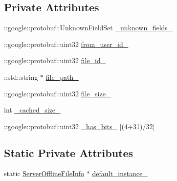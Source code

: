 \subsection*{Private Attributes}
\begin{DoxyCompactItemize}
\item 
\+::google\+::protobuf\+::\+Unknown\+Field\+Set \hyperlink{class_i_m_1_1_base_define_1_1_server_offline_file_info_a3db371e69c6def9894e21b296302ea57}{\+\_\+unknown\+\_\+fields\+\_\+}
\item 
\+::google\+::protobuf\+::uint32 \hyperlink{class_i_m_1_1_base_define_1_1_server_offline_file_info_ac1843ffaebde6c9c5b87404a31636320}{from\+\_\+user\+\_\+id\+\_\+}
\item 
\+::google\+::protobuf\+::uint32 \hyperlink{class_i_m_1_1_base_define_1_1_server_offline_file_info_a6137b1abb1911c49ff18cbd3031d4242}{file\+\_\+id\+\_\+}
\item 
\+::std\+::string $\ast$ \hyperlink{class_i_m_1_1_base_define_1_1_server_offline_file_info_a78eb84e4c11bdc5b62bdcde159904f4d}{file\+\_\+path\+\_\+}
\item 
\+::google\+::protobuf\+::uint32 \hyperlink{class_i_m_1_1_base_define_1_1_server_offline_file_info_a8d5232f21d1eaf7d01e7539654be4c47}{file\+\_\+size\+\_\+}
\item 
int \hyperlink{class_i_m_1_1_base_define_1_1_server_offline_file_info_a7a01cffe93d5f2d4f9a39f7e14e12d40}{\+\_\+cached\+\_\+size\+\_\+}
\item 
\+::google\+::protobuf\+::uint32 \hyperlink{class_i_m_1_1_base_define_1_1_server_offline_file_info_ae1f819cd36cccc42685e356e17432b34}{\+\_\+has\+\_\+bits\+\_\+} \mbox{[}(4+31)/32\mbox{]}
\end{DoxyCompactItemize}
\subsection*{Static Private Attributes}
\begin{DoxyCompactItemize}
\item 
static \hyperlink{class_i_m_1_1_base_define_1_1_server_offline_file_info}{Server\+Offline\+File\+Info} $\ast$ \hyperlink{class_i_m_1_1_base_define_1_1_server_offline_file_info_abdbcb9311248fa7a76734b04350ab471}{default\+\_\+instance\+\_\+}
\end{DoxyCompactItemize}
